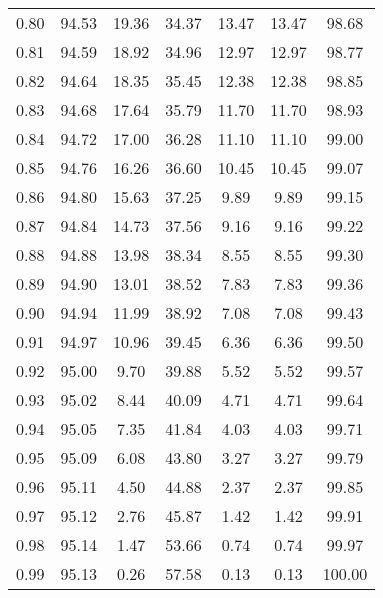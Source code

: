 \begin{tabular}{|c|c|c|c|c|c|c|}
      0.80 &     94.53 &     19.36 &      34.37 &   13.47 &      13.47 &         98.68 \\
      0.81 &     94.59 &     18.92 &      34.96 &   12.97 &      12.97 &         98.77 \\
      0.82 &     94.64 &     18.35 &      35.45 &   12.38 &      12.38 &         98.85 \\
      0.83 &     94.68 &     17.64 &      35.79 &   11.70 &      11.70 &         98.93 \\
      0.84 &     94.72 &     17.00 &      36.28 &   11.10 &      11.10 &         99.00 \\
      0.85 &     94.76 &     16.26 &      36.60 &   10.45 &      10.45 &         99.07 \\
      0.86 &     94.80 &     15.63 &      37.25 &    9.89 &       9.89 &         99.15 \\
      0.87 &     94.84 &     14.73 &      37.56 &    9.16 &       9.16 &         99.22 \\
      0.88 &     94.88 &     13.98 &      38.34 &    8.55 &       8.55 &         99.30 \\
      0.89 &     94.90 &     13.01 &      38.52 &    7.83 &       7.83 &         99.36 \\
      0.90 &     94.94 &     11.99 &      38.92 &    7.08 &       7.08 &         99.43 \\
      0.91 &     94.97 &     10.96 &      39.45 &    6.36 &       6.36 &         99.50 \\
      0.92 &     95.00 &      9.70 &      39.88 &    5.52 &       5.52 &         99.57 \\
      0.93 &     95.02 &      8.44 &      40.09 &    4.71 &       4.71 &         99.64 \\
      0.94 &     95.05 &      7.35 &      41.84 &    4.03 &       4.03 &         99.71 \\
      0.95 &     95.09 &      6.08 &      43.80 &    3.27 &       3.27 &         99.79 \\
      0.96 &     95.11 &      4.50 &      44.88 &    2.37 &       2.37 &         99.85 \\
      0.97 &     95.12 &      2.76 &      45.87 &    1.42 &       1.42 &         99.91 \\
      0.98 &     95.14 &      1.47 &      53.66 &    0.74 &       0.74 &         99.97 \\
      0.99 &     95.13 &      0.26 &      57.58 &    0.13 &       0.13 &        100.00 \\
\bottomrule
\end{tabular}
